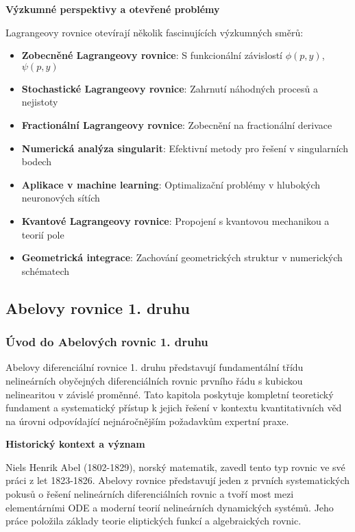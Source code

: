 \noindent\textbf{Výzkumné perspektivy a otevřené problémy}

Lagrangeovy rovnice otevírají několik fascinujících výzkumných směrů:
\begin{itemize}
\item \textbf{Zobecněné Lagrangeovy rovnice}: S funkcionální závislostí $\phi(p,y)$, $\psi(p,y)$
\item \textbf{Stochastické Lagrangeovy rovnice}: Zahrnutí náhodných procesů a nejistoty
\item \textbf{Fractionální Lagrangeovy rovnice}: Zobecnění na fractionální derivace
\item \textbf{Numerická analýza singularit}: Efektivní metody pro řešení v singularních bodech
\item \textbf{Aplikace v machine learning}: Optimalizační problémy v hlubokých neuronových sítích
\item \textbf{Kvantové Lagrangeovy rovnice}: Propojení s kvantovou mechanikou a teorií pole
\item \textbf{Geometrická integrace}: Zachování geometrických struktur v numerických schématech
\end{itemize}

\subsection{Abelovy rovnice 1. druhu}
\label{subsec:abelovy-rovnice-1-druhu}

\subsubsection{Úvod do Abelových rovnic 1. druhu}
\label{subsubsec:úvod-abel}

Abelovy diferenciální rovnice 1. druhu představují fundamentální třídu nelineárních obyčejných diferenciálních rovnic prvního řádu s kubickou nelinearitou v závislé proměnné. Tato kapitola poskytuje kompletní teoretický fundament a systematický přístup k jejich řešení v kontextu kvantitativních věd na úrovni odpovídající nejnáročnějším požadavkům expertní praxe.

\vspace{1\baselineskip}

\noindent\textbf{Historický kontext a význam}

Niels Henrik Abel (1802-1829), norský matematik, zavedl tento typ rovnic ve své práci z let 1823-1826. Abelovy rovnice představují jeden z prvních systematických pokusů o řešení nelineárních diferenciálních rovnic a tvoří most mezi elementárními ODE a moderní teorií nelineárních dynamických systémů. Jeho práce položila základy teorie eliptických funkcí a algebraických rovnic.

